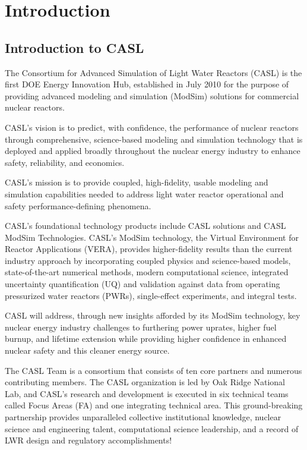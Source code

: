 \documentclass{report}
\numberwithin{equation}{section}
\begin{document}

\chapter{Introduction}

\section{Introduction to CASL}
The Consortium for Advanced Simulation of Light Water Reactors (CASL) is the first
DOE Energy Innovation Hub, established in July 2010 for the purpose of providing
advanced modeling and simulation (ModSim) solutions for commercial nuclear reactors.

CASL's vision is to predict, with confidence, the performance of nuclear reactors
through comprehensive, science-based modeling and simulation technology that is
deployed and applied broadly throughout the nuclear energy industry to enhance safety,
reliability, and economics.

CASL's mission is to provide coupled, high-fidelity, usable modeling and simulation
capabilities needed to address light water reactor operational and safety performance-defining phenomena.

CASL's foundational technology products include CASL solutions and CASL ModSim Technologies.
CASL's ModSim technology, the Virtual Environment for Reactor Applications (VERA), provides
higher-fidelity results than the current industry approach by incorporating coupled physics
and science-based models, state-of-the-art numerical methods, modern computational science,
integrated uncertainty quantification (UQ) and validation against data from operating
pressurized water reactors (PWRs), single-effect experiments, and integral tests.

CASL will address, through new insights afforded by its ModSim technology, key nuclear
energy industry challenges to furthering power uprates, higher fuel burnup, and lifetime
extension while providing higher confidence in enhanced nuclear safety and this cleaner energy source.

The CASL Team is a consortium that consists of ten core partners and numerous contributing members.
The CASL organization is led by Oak Ridge National Lab, and CASL's research and development is executed
in six technical teams called Focus Areas (FA) and one integrating technical area.
This ground-breaking partnership provides unparalleled
collective institutional knowledge, nuclear science and engineering talent, computational
science leadership, and a record of LWR design and regulatory accomplishments!
\end{document}
